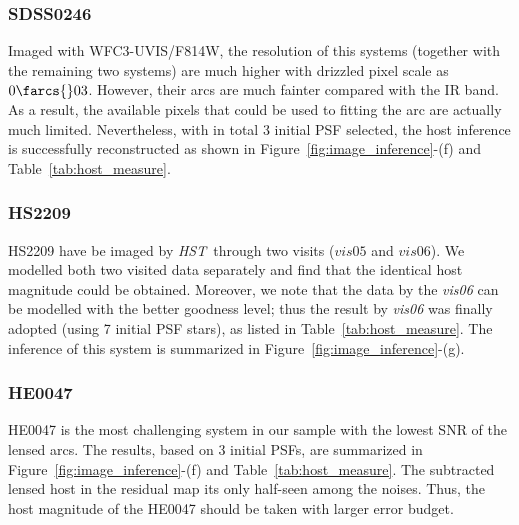 \documentclass[fleqn,usenatbib]{mnras}
\newcommand{\hst}{{\it HST}}
\begin{document}
\subsubsection{SDSS0246}
Imaged with WFC3-UVIS/F814W, the resolution of this systems (together with the remaining two systems) are much higher with drizzled pixel scale as $0\farcs{}03$. However, their arcs are much fainter compared with the IR band. As a result, the available pixels that could be used to fitting the arc are actually much limited. Nevertheless, with in total 3 initial PSF selected, the host inference is successfully reconstructed as shown in Figure~\ref{fig:image_inference}-(f) and Table~\ref{tab:host_measure}. 

\subsubsection{HS2209}
HS2209 have be imaged by \hst\ through two visits ($vis05$ and $vis06$). We modelled both two visited data separately and find that the identical host magnitude could be obtained. Moreover, we note that the data by the {\it vis06} can be modelled with the better goodness level; thus the result by {\it vis06} was finally adopted (using 7 initial PSF stars), as listed in Table~\ref{tab:host_measure}. The inference of this system is summarized in Figure~\ref{fig:image_inference}-(g).

\subsubsection{HE0047}
HE0047 is the most challenging system in our sample with the lowest SNR of the lensed arcs. The results, based on 3 initial PSFs, are summarized in Figure~\ref{fig:image_inference}-(f) and Table~\ref{tab:host_measure}. The subtracted lensed host in the residual map its only half-seen among the noises. Thus, the host magnitude of the HE0047 should be taken with larger error budget.
\end{document}
